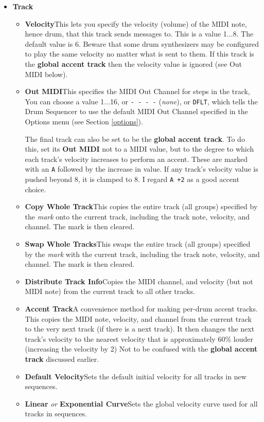 \documentclass{article}
\begin{document}
\begin{itemize}
\item {\bf Track}
\begin{itemize}
\item {\bf Velocity}\quad This lets you specify the velocity (volume) of the MIDI note, hence drum, that this track sends messages to.  This is a value 1...8.   The default value is 6.  Beware that some drum synthesizers may be configured to play the same velocity no matter what is sent to them.   If this track is the {\bf global accent track} then the velocity value is ignored (see Out MIDI below).
\item {\bf Out MIDI}\quad This specifies the MIDI Out Channel for steps in the track,    You can choose a value 1...16, or \texttt{- - - -} ({\it none}), or \texttt{DFLT}, which tells the Drum Sequencer to use the default MIDI Out Channel specified in the Options menu (see Section \ref{options}).  

The final track can also be set to be the {\bf global accent track}.  To do this, set its {\bf Out MIDI} not to a MIDI value, but to the degree to which each track's velocity increases to perform an accent. These are marked with an {\tt A} followed by the increase in value.  If any track's velocity value is pushed beyond 8, it is clamped to 8.  I regard {\tt A +2} as a good accent choice.

\item {\bf Copy Whole Track}\quad This copies the entire track (all groups) specified by the {\it mark} onto the current track, including the track note, velocity, and channel.  The mark is then cleared.
\item {\bf Swap Whole Tracks}\quad This swaps the entire track (all groups) specified by the {\it mark} with the current track, including the track note, velocity, and channel.  The mark is then cleared.
\item {\bf Distribute Track Info}\quad Copies the MIDI channel, and velocity (but not MIDI note) from the current track to all other tracks.  
\item {\bf Accent Track}\quad \label{accenttrack}A convenience method for making per-drum accent tracks.  This copies the MIDI note, velocity, and channel from the current track to the very next track (if there is a next track).  It then changes the next track's velocity to the nearest velocity that is approximately 60\% louder (increasing the velocity by 2)  Not to be confused with the {\bf global accent track} discussed earlier.
\item {\bf Default Velocity}\quad Sets the default initial velocity for all tracks in new sequences.
\item {\bf Linear} {\it or} {\bf Exponential Curve}\quad Sets the global velocity curve used for all tracks in sequences.
\end{itemize}


\end{itemize}
\end{document}
